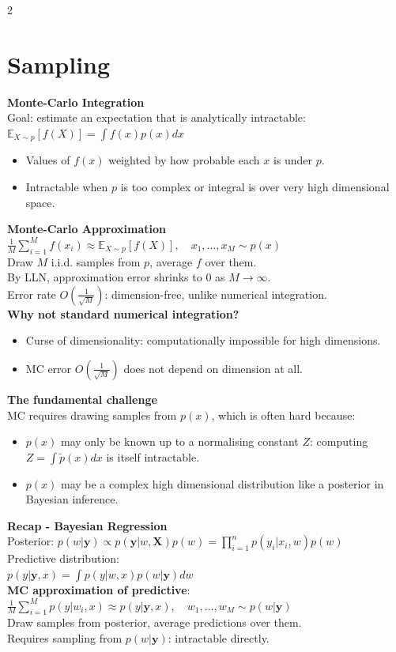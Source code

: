 \documentclass[10pt]{article}
\begin{document}
\begin{multicols*}{2}
\section*{Sampling}
\textbf{Monte-Carlo Integration}\\
Goal: estimate an expectation that is analytically intractable:\\
$\mathbb{E}_{X \sim p}[f(X)] = \int f(x)p(x)dx$\\
\begin{itemize}
    \item Values of $f(x)$ weighted by how probable each $x$ is under $p$.
    \item Intractable when $p$ is too complex or integral is over very high dimensional space.
\end{itemize}
\textbf{Monte-Carlo Approximation}
$\frac{1}{M}\sum_{i=1}^{M} f(x_i) \approx \mathbb{E}_{X \sim p}[f(X)], \quad x_1, \dots, x_M \sim p(x)$\\
Draw $M$ i.i.d. samples from $p$, average $f$ over them.\\
By LLN, approximation error shrinks to 0 as $M \to \infty$.\\
Error rate $O(\frac{1}{\sqrt{M}})$: dimension-free, unlike numerical integration.\\
\textbf{Why not standard numerical integration?}\\
\begin{itemize}
    \item Curse of dimensionality: computationally impossible for high dimensions.
    \item MC error $O(\frac{1}{\sqrt{M}})$ does not depend on dimension at all.
\end{itemize}
\textbf{The fundamental challenge}\\
MC requires drawing samples from $p(x)$, which is often hard because:\\
\begin{itemize}
    \item $p(x)$ may only be known up to a normalising constant $Z$: computing $Z = \int \tilde{p}(x)dx$ is itself intractable.
    \item $p(x)$ may be a complex high dimensional distribution like a posterior in Bayesian inference.
\end{itemize}
\vspace{1em}
\textbf{Recap - Bayesian Regression}\\
Posterior:
$p(w|\mathbf{y}) \propto p(\mathbf{y}|w, \mathbf{X})p(w) = \prod_{i=1}^{n} p(y_i|x_i, w)p(w)$\\
Predictive distribution:\\
$p(y|\mathbf{y}, x) = \int p(y|w, x)p(w|\mathbf{y})dw$\\
\textbf{MC approximation of predictive}:
$\frac{1}{M}\sum_{i=1}^{M} p(y|w_i, x) \approx p(y|\mathbf{y}, x), \quad w_1, \dots, w_M \sim p(w|\mathbf{y})$\\
Draw samples from posterior, average predictions over them.\\
Requires sampling from $p(w|\mathbf{y})$: intractable directly.\\[\baselineskip]


\end{multicols*}
\end{document}

